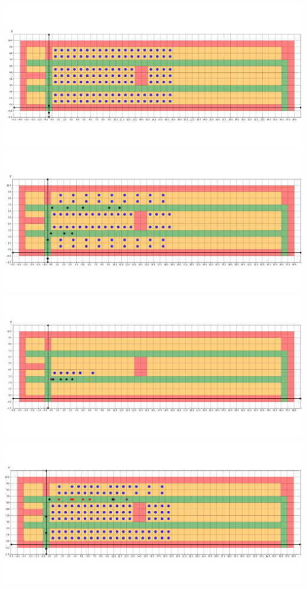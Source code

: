 \documentclass{article}
\begin{document}
	\begin{center}
		\includegraphics[width=14cm]{two1.jpg}\\
		\thispagestyle{empty}
		\includegraphics[width=14cm]{two2.jpg}\\
		\includegraphics[width=14cm]{two3.jpg}\\
		\includegraphics[width=14cm]{twobtf1.jpg}\\

\end{center}
\end{document}
